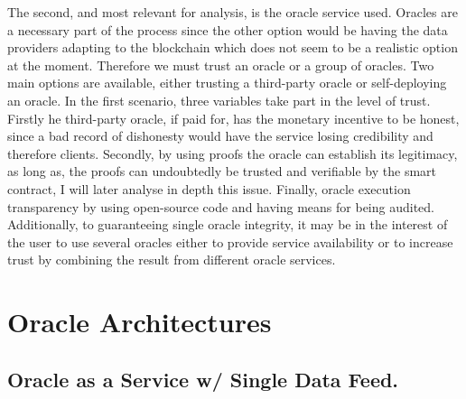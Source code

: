 The second, and most relevant for analysis, is the oracle service used. Oracles are a necessary part of the process since the other option would be having the data providers adapting to the blockchain which does not seem to be a realistic option at the moment. Therefore we must trust an oracle or a group of oracles. Two main options are available, either trusting a third-party oracle or self-deploying an oracle. In the first scenario, three variables take part in the level of trust. Firstly he third-party oracle, if paid for, has the monetary incentive to be honest, since a bad record of dishonesty would have the service losing credibility and therefore clients. Secondly, by using proofs the oracle can establish its legitimacy, as long as, the proofs can undoubtedly be trusted and verifiable by the smart contract, I will later analyse in depth this issue. Finally, oracle execution transparency by using open-source code and having means for being audited. Additionally, to guaranteeing single oracle integrity, it may be in the interest of the user to use several oracles either to provide service availability or to increase trust by combining the result from different oracle services.


\section{Oracle Architectures}




\subsection{Oracle as a Service w/ Single Data Feed.}

